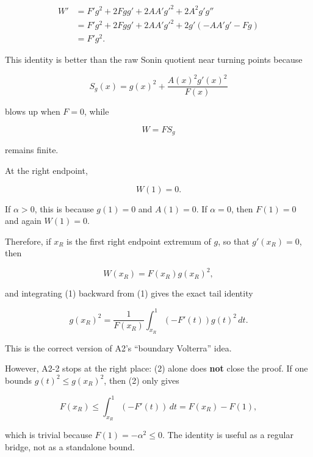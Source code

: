\documentclass[11pt]{article}
\begin{document}
\begin{equation*}
\begin{aligned}
W'
&=F'g^2+2Fgg'+2AA'g'^2+2A^2g'g'' \\
&=F'g^2+2Fgg'+2AA'g'^2
+2g'(-AA'g'-Fg)\\
&=F'g^2.
\end{aligned}
\end{equation*}


This identity is better than the raw Sonin quotient near turning points because

\begin{equation*}
S_g(x)=g(x)^2+\frac{A(x)^2g'(x)^2}{F(x)}
\end{equation*}


blows up when \(F=0\), while

\begin{equation*}
\boxed{
W=F S_g
}
\end{equation*}


remains finite.

At the right endpoint,

\begin{equation*}
W(1)=0.
\end{equation*}


If \(\alpha>0\), this is because \(g(1)=0\) and \(A(1)=0\). If \(\alpha=0\), then \(F(1)=0\) and again \(W(1)=0\).

Therefore, if \(x_R\) is the first right endpoint extremum of \(g\), so that \(g'(x_R)=0\), then

\begin{equation*}
W(x_R)=F(x_R)g(x_R)^2,
\end{equation*}


and integrating (1) backward from (1) gives the exact tail identity

\begin{equation*}
\boxed{
g(x_R)^2
=
\frac{1}{F(x_R)}
\int_{x_R}^{1}(-F'(t))g(t)^2\,dt.
}
\tag{2}
\end{equation*}


This is the correct version of A2's ``boundary Volterra'' idea.

However, A2-2 stops at the right place: (2) alone does \textbf{not} close the proof. If one bounds \(g(t)^2\le g(x_R)^2\), then (2) only gives

\begin{equation*}
F(x_R)
\le
\int_{x_R}^{1}(-F'(t))\,dt
=
F(x_R)-F(1),
\end{equation*}


which is trivial because \(F(1)=-\alpha^2\le0\). The identity is useful as a regular bridge, not as a standalone bound.
\end{document}
